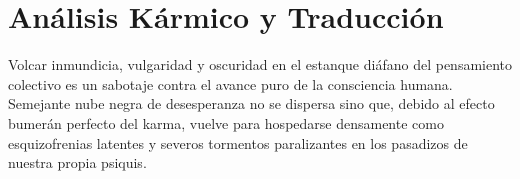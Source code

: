 \section{Análisis Kármico y Traducción}
\begin{figure}
  \vspace{-1.5em}
  \begin{center}
  \end{center}
  \vspace{-1.5em}
\end{figure}
Volcar inmundicia, vulgaridad y oscuridad en el estanque diáfano del pensamiento colectivo es un sabotaje contra el avance puro de la consciencia humana. Semejante nube negra de desesperanza no se dispersa sino que, debido al efecto bumerán perfecto del karma, vuelve para hospedarse densamente como esquizofrenias latentes y severos tormentos paralizantes en los pasadizos de nuestra propia psiquis.

